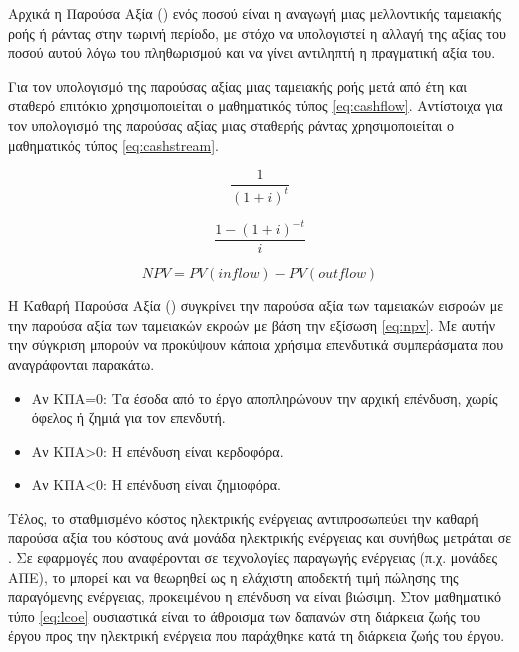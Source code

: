 \documentclass[12pt]{report}
\begin{document}
Αρχικά η Παρούσα Αξία ({}) ενός ποσού είναι η αναγωγή μιας μελλοντικής ταμειακής ροής ή ράντας στην τωρινή περίοδο, με στόχο να υπολογιστεί η αλλαγή της αξίας του ποσού αυτού λόγω του πληθωρισμού 
και να γίνει αντιληπτή η πραγματική αξία του.

Για τον υπολογισμό της παρούσας αξίας μιας ταμειακής ροής μετά από {} έτη και σταθερό επιτόκιο {} χρησιμοποιείται ο μαθηματικός τύπος \ref{eq:cashflow}. Αντίστοιχα για τον υπολογισμό της παρούσας αξίας 
μιας σταθερής ράντας χρησιμοποιείται ο μαθηματικός τύπος \ref{eq:cashstream}.

{\large
\begin{equation}
	\frac{1}{(1+i)^t}
\label{eq:cashflow}
\end{equation}

\begin{equation}
	\frac{1- (1+i)^{-t}}{i}
\label{eq:cashstream}
\end{equation}
}
{\normalsize
\begin{equation}
	NPV = PV(inflow) - PV(outflow)
\label{eq:npv}
\end{equation}
}

Η Καθαρή Παρούσα Αξία ({}) συγκρίνει την παρούσα αξία των ταμειακών εισροών με την παρούσα αξία των ταμειακών εκροών με βάση την εξίσωση \ref{eq:npv}. Με αυτήν την σύγκριση μπορούν να προκύψουν 
κάποια χρήσιμα επενδυτικά συμπεράσματα που αναγράφονται παρακάτω.

\begin{itemize}
\item Αν ΚΠΑ=0: Τα έσοδα από το έργο αποπληρώνουν την αρχική επένδυση, χωρίς όφελος ή ζημιά για τον επενδυτή.
\item Αν ΚΠΑ\textgreater 0: Η επένδυση είναι κερδοφόρα.
\item Αν ΚΠΑ\textless 0: Η επένδυση είναι ζημιοφόρα.
\end{itemize}

Τέλος, το σταθμισμένο κόστος ηλεκτρικής ενέργειας {} αντιπροσωπεύει την καθαρή παρούσα αξία του κόστους ανά μονάδα ηλεκτρικής ενέργειας και συνήθως μετράται σε {}. 
Σε εφαρμογές που αναφέρονται σε τεχνολογίες παραγωγής ενέργειας (π.χ. μονάδες ΑΠΕ), το {} μπορεί και να θεωρηθεί ως η ελάχιστη αποδεκτή τιμή πώλησης της παραγόμενης ενέργειας, προκειμένου η επένδυση να είναι βιώσιμη.
Στον μαθηματικό τύπο \ref{eq:lcoe} ουσιαστικά είναι το άθροισμα των δαπανών στη διάρκεια ζωής του έργου προς την ηλεκτρική ενέργεια που παράχθηκε κατά τη διάρκεια ζωής του έργου.
\end{document}
